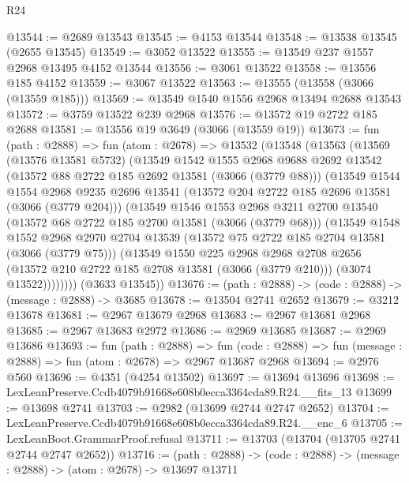 \begin{lexlean}{R24}
\begin{coremodule}
@13544 := @2689 @13543
@13545 := @4153 @13544
@13548 := @13538 @13545 (@2655 @13545)
@13549 := @3052 @13522
@13555 := @13549 @237 @1557 @2968 @13495 @4152 @13544
@13556 := @3061 @13522
@13558 := @13556 @185 @4152
@13559 := @3067 @13522
@13563 := @13555 (@13558 (@3066 (@13559 @185)))
@13569 := @13549 @1540 @1556 @2968 @13494 @2688 @13543
@13572 := @3759 @13522 @239 @2968
@13576 := @13572 @19 @2722 @185 @2688
@13581 := @13556 @19 @3649 (@3066 (@13559 @19))
@13673 := fun (path : @2888) =>
  fun (atom : @2678) =>
  @13532
    (@13548
      (@13563
        (@13569
          (@13576 @13581 @5732)
          (@13549
            @1542
            @1555
            @2968
            @9688
            @2692
            @13542
            (@13572 @88 @2722 @185 @2692 @13581 (@3066 (@3779 @88)))
            (@13549
              @1544
              @1554
              @2968
              @9235
              @2696
              @13541
              (@13572 @204 @2722 @185 @2696 @13581 (@3066 (@3779 @204)))
              (@13549
                @1546
                @1553
                @2968
                @3211
                @2700
                @13540
                (@13572 @68 @2722 @185 @2700 @13581 (@3066 (@3779 @68)))
                (@13549
                  @1548
                  @1552
                  @2968
                  @2970
                  @2704
                  @13539
                  (@13572 @75 @2722 @185 @2704 @13581 (@3066 (@3779 @75)))
                  (@13549
                    @1550
                    @225
                    @2968
                    @2968
                    @2708
                    @2656
                    (@13572 @210 @2722 @185 @2708 @13581 (@3066 (@3779 @210)))
                    (@3074 @13522))))))))
      (@3633 @13545))
@13676 := (path : @2888) -> (code : @2888) -> (message : @2888) -> @3685
@13678 := @13504 @2741 @2652
@13679 := @3212 @13678
@13681 := @2967 @13679 @2968
@13683 := @2967 @13681 @2968
@13685 := @2967 @13683 @2972
@13686 := @2969 @13685
@13687 := @2969 @13686
@13693 := fun (path : @2888) =>
  fun (code : @2888) => fun (message : @2888) => fun (atom : @2678) => @2967 @13687 @2968
@13694 := @2976 @560
@13696 := @4351 (@4254 @13502)
@13697 := @13694 @13696
@13698 := LexLeanPreserve.Ccdb4079b91668e608b0ecca3364cda89.R24.__fits_13
@13699 := @13698 @2741
@13703 := @2982 (@13699 @2744 @2747 @2652)
@13704 := LexLeanPreserve.Ccdb4079b91668e608b0ecca3364cda89.R24.__enc_6
@13705 := LexLeanBoot.GrammarProof.refusal
@13711 := @13703 (@13704 (@13705 @2741 @2744 @2747 @2652))
@13716 := (path : @2888) -> (code : @2888) -> (message : @2888) -> (atom : @2678) -> @13697 @13711

\end{coremodule}
\end{lexlean}
